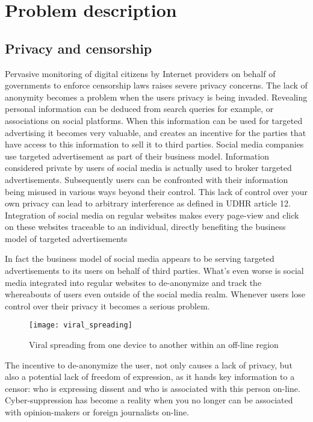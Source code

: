 \chapter{Problem description}
\label{ch:problem_desc}

\section{Privacy and censorship}
Pervasive monitoring of digital citizens by Internet providers on behalf of governments to enforce censorship laws raises severe privacy concerns.
The lack of anonymity becomes a problem when the users privacy is being invaded.
Revealing personal information can be deduced from search queries for example, or associations on social platforms.
When this information can be used for targeted advertising it becomes very valuable, and creates an incentive for the parties that have access to this information to sell it to third parties.
Social media companies use targeted advertisement as part of their business model.
Information considered private by users of social media is actually used to broker targeted advertisements.
Subsequently users can be confronted with their information being misused in various ways beyond their control.
This lack of control over your own privacy can lead to arbitrary interference as defined in UDHR article 12. %
Integration of social media on regular websites makes every page-view and click on these websites traceable to an individual, directly benefiting the business model of targeted advertisements

In fact the business model of social media appears to be serving targeted advertisements to its users on behalf of third parties.
What's even worse is social media integrated into regular websites to de-anonymize and track the whereabouts of users even outside of the social media realm.
Whenever users lose control over their privacy it becomes a serious problem.

\begin{figure}[h]
	\centering
	\texttt{[image: viral\_spreading]}
	\caption{Viral spreading from one device to another within an off-line region}
	\label{fig:viral_spreading}
\end{figure}

The incentive to de-anonymize the user, not only causes a lack of privacy, but also a potential lack of freedom of expression, as it hands key information to a censor: who is expressing dissent and who is associated with this person on-line.
Cyber-suppression has become a reality when you no longer can be associated with opinion-makers or foreign journalists on-line.

